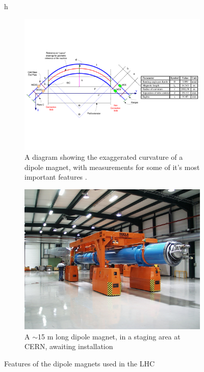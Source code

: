 \begin{figure}{h}
\begin{subfigure}[h]{0.450\textwidth}
        \includegraphics[width=\textwidth]{Figures/LHC_Diagrams/LHC_Dipole_ExageratedCurvature.pdf}
        \caption{A diagram showing the exaggerated curvature of a
          dipole magnet, with measurements for some of it's most
          important features \cite{LHC:LHC_lhc_dipole_Beauquis}. }\label{fig:lhc_dipole_curvature}
      \end{subfigure}
      \begin{subfigure}[h]{0.450\textwidth}
        \includegraphics[width=\textwidth]{Figures/LHC_Diagrams/LHC_Dipole_transp-2001-001_05.jpg}
        \caption{A $\sim$15 m long dipole magnet, in a staging area at
        CERN, awaiting installation \cite{LHC:LHC_lhc_dipole_image}}\label{fig:lhc_dipole_staging}
      \end{subfigure}
       \caption{Features of the dipole magnets used in the LHC}\label{fig:lhc_dipole}
\end{figure}


